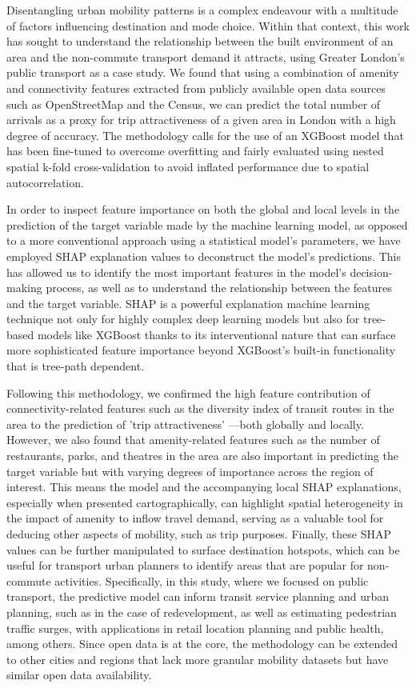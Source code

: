 
Disentangling urban mobility patterns is a complex endeavour with a multitude of factors influencing destination and mode choice. Within that context, this work has sought to understand the relationship between the built environment of an area and the non-commute transport demand it attracts, using Greater London's public transport as a case study. We found that using a combination of amenity and connectivity features extracted from publicly available open data sources such as OpenStreetMap and the Census, we can predict the total number of arrivals as a proxy for trip attractiveness of a given area in London with a high degree of accuracy. The methodology calls for the use of an XGBoost model that has been fine-tuned to overcome overfitting and fairly evaluated using nested spatial k-fold cross-validation to avoid inflated performance due to spatial autocorrelation. 

In order to inspect feature importance on both the global and local levels in the prediction of the target variable made by the machine learning model, as opposed to a more conventional approach using a statistical model's parameters, we have employed SHAP explanation values to deconstruct the model's predictions. This has allowed us to identify the most important features in the model's decision-making process, as well as to understand the relationship between the features and the target variable. SHAP is a powerful explanation machine learning technique not only for highly complex deep learning models but also for tree-based models like XGBoost thanks to its interventional nature that can surface more sophisticated feature importance beyond XGBoost's built-in functionality that is tree-path dependent.

Following this methodology, we confirmed the high feature contribution of connectivity-related features such as the diversity index of transit routes in the area to the prediction of 'trip attractiveness' ---both globally and locally. However, we also found that amenity-related features such as the number of restaurants, parks, and theatres in the area are also important in predicting the target variable but with varying degrees of importance across the region of interest. This means the model and the accompanying local SHAP explanations, especially when presented cartographically, can highlight spatial heterogeneity in the impact of amenity to inflow travel demand, serving as a valuable tool for deducing other aspects of mobility, such as trip purposes. Finally, these SHAP values can be further manipulated to surface destination hotspots, which can be useful for transport urban planners to identify areas that are popular for non-commute activities. Specifically, in this study, where we focused on public transport, the predictive model can inform transit service planning and urban planning, such as in the case of redevelopment, as well as estimating pedestrian traffic surges, with applications in retail location planning and public health, among others. Since open data is at the core, the methodology can be extended to other cities and regions that lack more granular mobility datasets but have similar open data availability.

